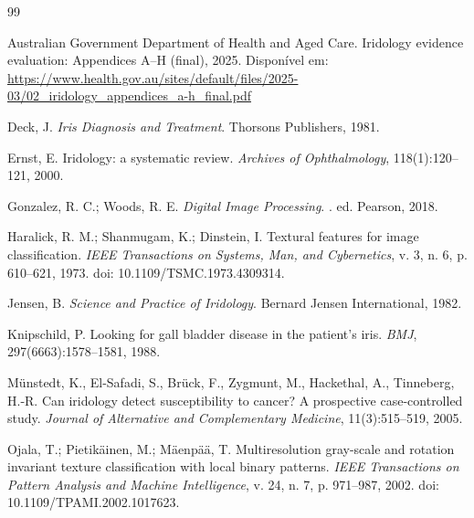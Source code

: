 \documentclass[12pt,a4paper]{article}
\begin{document}
\newpage
\begin{thebibliography}{99}

Australian Government Department of Health and Aged Care.
\newblock Iridology evidence evaluation: Appendices A--H (final), 2025.
\newblock Disponível em: \url{https://www.health.gov.au/sites/default/files/2025-03/02_iridology_appendices_a-h_final.pdf}

Deck, J.
\newblock \emph{Iris Diagnosis and Treatment}.
\newblock Thorsons Publishers, 1981.

Ernst, E.
\newblock Iridology: a systematic review.
\newblock \emph{Archives of Ophthalmology}, 118(1):120--121, 2000.

Gonzalez, R. C.; Woods, R. E.
\newblock \emph{Digital Image Processing}.
. ed.
\newblock Pearson, 2018.

Haralick, R. M.; Shanmugam, K.; Dinstein, I.
\newblock Textural features for image classification.
\newblock \emph{IEEE Transactions on Systems, Man, and Cybernetics}, v. 3, n. 6, p. 610--621, 1973.
\newblock doi: 10.1109/TSMC.1973.4309314.

Jensen, B.
\newblock \emph{Science and Practice of Iridology}.
\newblock Bernard Jensen International, 1982.

Knipschild, P.
\newblock Looking for gall bladder disease in the patient's iris.
\newblock \emph{BMJ}, 297(6663):1578--1581, 1988.

M{\"u}nstedt, K., El-Safadi, S., Br{\"u}ck, F., Zygmunt, M., Hackethal, A., Tinneberg, H.-R.
\newblock Can iridology detect susceptibility to cancer? A prospective case-controlled study.
\newblock \emph{Journal of Alternative and Complementary Medicine}, 11(3):515--519, 2005.

Ojala, T.; Pietik\"ainen, M.; M\"aenp\"a\"a, T.
\newblock Multiresolution gray-scale and rotation invariant texture classification with local binary patterns.
\newblock \emph{IEEE Transactions on Pattern Analysis and Machine Intelligence}, v. 24, n. 7, p. 971--987, 2002.
\newblock doi: 10.1109/TPAMI.2002.1017623.


\end{thebibliography}
\end{document}
